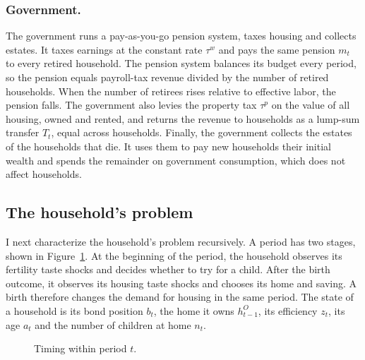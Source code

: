 \subsubsection*{Government.}
The government runs a pay-as-you-go pension system, taxes housing and collects
estates. It taxes
earnings at the constant rate $\tau^w$ and pays the same pension $m_t$ to
every retired household. The pension system balances its budget every period,
so the pension equals payroll-tax revenue divided by the number of retired
households. When the number of retirees rises relative to effective labor, the
pension falls. The government also levies the property tax $\tau^p$ on the
value of all housing, owned and rented, and returns the revenue to households
as a lump-sum transfer $T_t$, equal across households. Finally, the government
collects the estates of the households that die. It uses them to pay new
households their initial wealth and spends the remainder on government
consumption, which does not affect households.

\subsection{The household's problem}
\label{sec:m-household}

I next characterize the household's problem recursively. A period has two
stages, shown in Figure~\ref{fig:m-timing}. At the beginning of the period,
the household observes its fertility taste shocks and decides whether to try
for a child. After the birth outcome, it observes its housing taste shocks and
chooses its home and saving. A birth therefore changes the demand for housing
in the same period. The state of a household is its bond position $b_t$, the
home it owns $h^O_{t-1}$, its efficiency $z_t$, its age $a_t$ and the number of
children at home $n_t$.

\begin{figure}[ht]
\centering
{}
\caption{Timing within period $t$.}
\label{fig:m-timing}
\end{figure}

